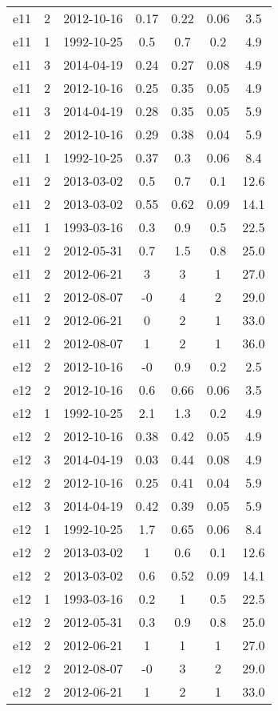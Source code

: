 \begin{table*}[htp]
\begin{tabular}{ccccccc}
e11 & 2 & 2012-10-16 & 0.17 & 0.22 & 0.06 & 3.5 \\
e11 & 1 & 1992-10-25 & 0.5 & 0.7 & 0.2 & 4.9 \\
e11 & 3 & 2014-04-19 & 0.24 & 0.27 & 0.08 & 4.9 \\
e11 & 2 & 2012-10-16 & 0.25 & 0.35 & 0.05 & 4.9 \\
e11 & 3 & 2014-04-19 & 0.28 & 0.35 & 0.05 & 5.9 \\
e11 & 2 & 2012-10-16 & 0.29 & 0.38 & 0.04 & 5.9 \\
e11 & 1 & 1992-10-25 & 0.37 & 0.3 & 0.06 & 8.4 \\
e11 & 2 & 2013-03-02 & 0.5 & 0.7 & 0.1 & 12.6 \\
e11 & 2 & 2013-03-02 & 0.55 & 0.62 & 0.09 & 14.1 \\
e11 & 1 & 1993-03-16 & 0.3 & 0.9 & 0.5 & 22.5 \\
e11 & 2 & 2012-05-31 & 0.7 & 1.5 & 0.8 & 25.0 \\
e11 & 2 & 2012-06-21 & 3 & 3 & 1 & 27.0 \\
e11 & 2 & 2012-08-07 & -0 & 4 & 2 & 29.0 \\
e11 & 2 & 2012-06-21 & 0 & 2 & 1 & 33.0 \\
e11 & 2 & 2012-08-07 & 1 & 2 & 1 & 36.0 \\
e12 & 2 & 2012-10-16 & -0 & 0.9 & 0.2 & 2.5 \\
e12 & 2 & 2012-10-16 & 0.6 & 0.66 & 0.06 & 3.5 \\
e12 & 1 & 1992-10-25 & 2.1 & 1.3 & 0.2 & 4.9 \\
e12 & 2 & 2012-10-16 & 0.38 & 0.42 & 0.05 & 4.9 \\
e12 & 3 & 2014-04-19 & 0.03 & 0.44 & 0.08 & 4.9 \\
e12 & 2 & 2012-10-16 & 0.25 & 0.41 & 0.04 & 5.9 \\
e12 & 3 & 2014-04-19 & 0.42 & 0.39 & 0.05 & 5.9 \\
e12 & 1 & 1992-10-25 & 1.7 & 0.65 & 0.06 & 8.4 \\
e12 & 2 & 2013-03-02 & 1 & 0.6 & 0.1 & 12.6 \\
e12 & 2 & 2013-03-02 & 0.6 & 0.52 & 0.09 & 14.1 \\
e12 & 1 & 1993-03-16 & 0.2 & 1 & 0.5 & 22.5 \\
e12 & 2 & 2012-05-31 & 0.3 & 0.9 & 0.8 & 25.0 \\
e12 & 2 & 2012-06-21 & 1 & 1 & 1 & 27.0 \\
e12 & 2 & 2012-08-07 & -0 & 3 & 2 & 29.0 \\
e12 & 2 & 2012-06-21 & 1 & 2 & 1 & 33.0 \\

\end{tabular}
\end{table*}
